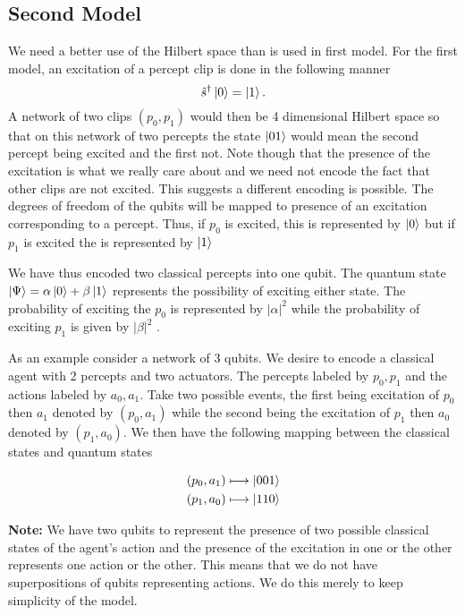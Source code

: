 \documentclass[twocolumn,prX,longbibliography]{revtex4}
\begin{document}
 \subsection{Second Model}
 We need a better use of the Hilbert space than is used in first model. For the first model, an excitation of a percept clip is done in the following manner
 \begin{equation}
   \hat{s}^{\dagger}\ket{0}= \ket{1}.
 \end{equation}
 A network of two clips \( (p_0, p_1)\) would then be 4 dimensional Hilbert space so that on this network of two percepts the state  \(\ket{01} \) would mean the second percept being excited and the first not. Note though that the presence of the excitation is what we really care about and we need not encode the fact that other clips are not excited. This suggests a different encoding is possible. The degrees of freedom of the qubits will be mapped to presence of an excitation corresponding to a percept. Thus, if \(p_0 \) is excited, this is represented by \( \ket{0} \) but if \( p_1 \) is excited the is represented by \( \ket{1} \) \newline
 
 We have thus encoded two classical percepts into one qubit. The quantum state \( \ket{\Psi}= \alpha\ket{0} + \beta \ket{1} \) represents the possibility of exciting either state. The probability of exciting the \( p_0 \) is represented by \( \vert \alpha \vert ^2 \) while the probability of exciting \( p_1\) is given by \( \vert \beta \vert^2 \) . 
 
 As an example consider a network of 3 qubits. We desire to encode a classical agent with 2 percepts and two actuators. The percepts labeled by \( p_0, p_1 \) and the actions labeled by \(a_0, a_1 \). Take two possible events, the first being excitation of \(p_0\) then \(a_1\) denoted by \( (p_0,a_1) \) while the second being the excitation of \(p_1\) then \(a_0\) denoted by  \( (p_1, a_0)\). We then have the following mapping between the classical states and quantum states
 
 \begin{align}
  (p_0,a_1) \longmapsto \ket{001} \\
  (p_1, a_0) \longmapsto \ket{110}
 \end{align}

\textbf{Note:} We have two qubits to represent the presence of two possible classical states of the agent's action and the presence of the excitation in one or the other represents one action or the other. This means that we do not have superpositions of qubits representing actions. We do this merely to keep simplicity of the model. \newline
 
\end{document}
